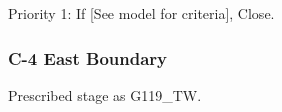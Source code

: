 \begin{packed_items}
\item Priority 1: If \textcolor[rgb]{1.00,0.00,0.00}{[See model for criteria]}, Close.
\end{packed_items}


%
%



\clearpage

\subsubsection{C-4 East Boundary}

Prescribed stage as G119\_TW.


